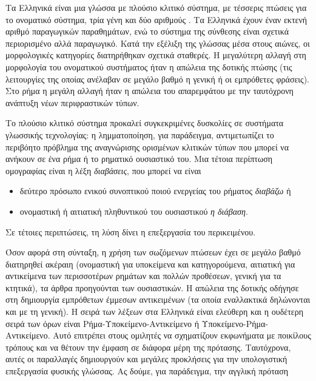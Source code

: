 \begin{multicols}{2}
Τα Ελληνικά είναι μια γλώσσα με πλούσιο κλιτικό σύστημα, με τέσσερις πτώσεις για το ονοματικό σύστημα, τρία γένη και δύο αριθμούς \cite{Mack1}. Τα Ελληνικά έχουν έναν εκτενή  αριθμό  παραγωγικών παραθημάτων, ενώ το σύστημα της σύνθεσης είναι σχετικά περιορισμένο αλλά παραγωγικό. Κατά την εξέλιξη της γλώσσας μέσα στους αιώνες, οι μορφολογικές κατηγορίες διατηρήθηκαν σχετικά σταθερές. Η μεγαλύτερη αλλαγή στη μορφολογία του ονοματικού συστήματος ήταν η απώλεια της δοτικής πτώσης (τις λειτουργίες της οποίας ανέλαβαν σε μεγάλο βαθμό η γενική ή οι εμπρόθετες φράσεις). Στο ρήμα η μεγάλη αλλαγή ήταν η απώλεια του απαρεμφάτου με την ταυτόχρονη ανάπτυξη νέων περιφραστικών τύπων.


Το πλούσιο κλιτικό σύστημα προκαλεί συγκεκριμένες δυσκολίες σε συστήματα γλωσσικής τεχνολογίας: η λημματοποίηση, για παράδειγμα, αντιμετωπίζει το περιβόητο πρόβλημα της αναγνώρισης ορισμένων κλιτικών τύπων που μπορεί να ανήκουν σε ένα ρήμα ή το ρηματικό ουσιαστικό του. Μια τέτοια περίπτωση ομογραφίας είναι η λέξη \textit{διαβάσεις}, που μπορεί να είναι

\begin{itemize}
\item δεύτερο πρόσωπο ενικού συνοπτικού ποιού ενεργείας του ρήματος \textit{διαβάζω} ή
\item ονομαστική ή αιτιατική πληθυντικού του ουσιαστικού \textit{η διάβαση}.
\end{itemize}

Σε τέτοιες περιπτώσεις, τη λύση δίνει η επεξεργασία του περικειμένου.

Όσον αφορά στη σύνταξη, η χρήση των σωζόμενων πτώσεων έχει σε μεγάλο βαθμό διατηρηθεί ακέραιη (ονομαστική για υποκείμενα και κατηγορούμενα, αιτιατική για αντικείμενα των περισσοτέρων ρημάτων και πολλών προθέσεων, γενική για τα κτητικά), τα άρθρα προηγούνται των ουσιαστικών. Η απώλεια της δοτικής οδήγησε στη δημιουργία εμπρόθετων έμμεσων αντικειμένων (τα οποία εναλλακτικά  δηλώνονται και με τη γενική). Η σειρά των λέξεων στα Ελληνικά είναι ελεύθερη και η ουδέτερη σειρά των όρων είναι Ρήμα-Υποκείμενο-Αντικείμενο ή Υποκείμενο-Ρήμα-Αντικείμενο. Αυτό επιτρέπει στους ομιλητές να σχηματίζουν εκφωνήματα με ποικίλους τρόπους και να θέτουν την έμφαση σε διάφορα μέρη της πρότασης. Ταυτόχρονα, αυτές οι παραλλαγές δημιουργούν και μεγάλες προκλήσεις για την υπολογιστική επεξεργασία φυσικής γλώσσας. Ας δούμε, για παράδειγμα, την αγγλική πρόταση


\end{multicols}
